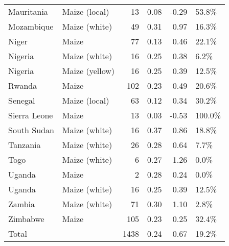 \begin{table}[ht]
\begin{tabular}{llrrrl}
  Mauritania & Maize (local) &  13 & 0.08 & -0.29 & 53.8\% \\ 
  Mozambique & Maize (white) &  49 & 0.31 & 0.97 & 16.3\% \\ 
  Niger & Maize &  77 & 0.13 & 0.46 & 22.1\% \\ 
  Nigeria & Maize (white) &  16 & 0.25 & 0.38 & 6.2\% \\ 
  Nigeria & Maize (yellow) &  16 & 0.25 & 0.39 & 12.5\% \\ 
  Rwanda & Maize & 102 & 0.23 & 0.49 & 20.6\% \\ 
  Senegal & Maize (local) &  63 & 0.12 & 0.34 & 30.2\% \\ 
  Sierra Leone & Maize &  13 & 0.03 & -0.53 & 100.0\% \\ 
  South Sudan & Maize (white) &  16 & 0.37 & 0.86 & 18.8\% \\ 
  Tanzania & Maize (white) &  26 & 0.28 & 0.64 & 7.7\% \\ 
  Togo & Maize (white) &   6 & 0.27 & 1.26 & 0.0\% \\ 
  Uganda & Maize &   2 & 0.28 & 0.24 & 0.0\% \\ 
  Uganda & Maize (white) &  16 & 0.25 & 0.39 & 12.5\% \\ 
  Zambia & Maize (white) &  71 & 0.30 & 1.10 & 2.8\% \\ 
  Zimbabwe & Maize & 105 & 0.23 & 0.25 & 32.4\% \\ 
  Total &  & 1438 & 0.24 & 0.67 & 19.2\% \\ 
   \hline
\end{tabular}
\end{table}

